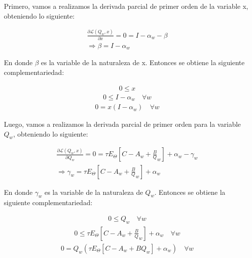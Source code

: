 Primero, vamos a realizamos la derivada parcial de primer orden de la variable x, obteniendo lo siguiente:

\begin{equation}
\begin{array}{rrclcl}
    \frac{\partial \mathcal{L}(Q_w,x)}{\partial x} = 0 = I - \alpha_w - \beta \\
    \Rightarrow \beta = I - \alpha_w
   \label{c318}
\end{array}
\end{equation}

En donde $\beta$ es la variable de la naturaleza de x. Entonces se obtiene la siguiente complementariedad:

\begin{equation}
\begin{array}{rrclcl}
   0\leq x \label{c319}
\end{array}
\end{equation}
\begin{equation}
\begin{array}{cl}
   0\leq I - \alpha_w \quad \forall w 
   \label{c320}
\end{array}
\end{equation}
\begin{equation}
\begin{array}{cl}
   0 = x(I - \alpha_w) \quad \forall w 
   \label{c321}
\end{array}
\end{equation}

Luego, vamos a realizamos la derivada parcial de primer orden para la variable $Q_w$, obteniendo lo siguiente:

\begin{equation}
\begin{array}{rrclcl}
    \frac{\partial \mathcal{L}(Q_w,x)}{\partial Q_w} = 0 = \tau E_{\Theta}[C-A_w+\frac{B}Q_w]+\alpha_w-\gamma_w\\
    \Rightarrow \gamma_w= \tau E_{\Theta}[C-A_w+\frac{B}Q_w]+\alpha_w
   \label{c322}
\end{array}
\end{equation}

En donde $\gamma_w$ es la variable de la naturaleza de $Q_w$. Entonces se obtiene la siguiente complementariedad:

\begin{equation}
\begin{array}{rrclcl}
   0\leq Q_w \quad \forall w
   \label{c323}
\end{array}
\end{equation}
\begin{equation}
\begin{array}{cl}
   0\leq \tau E_{\Theta}[C-A_w+\frac{B}Q_w]+\alpha_w \quad \forall w 
   \label{c324}
\end{array}
\end{equation}
\begin{equation}
\begin{array}{cl}
   0 = Q_w(\tau E_{\Theta}[C-A_w+BQ_w]+\alpha_w) \quad \forall w 
   \label{c325}
\end{array}
\end{equation}

